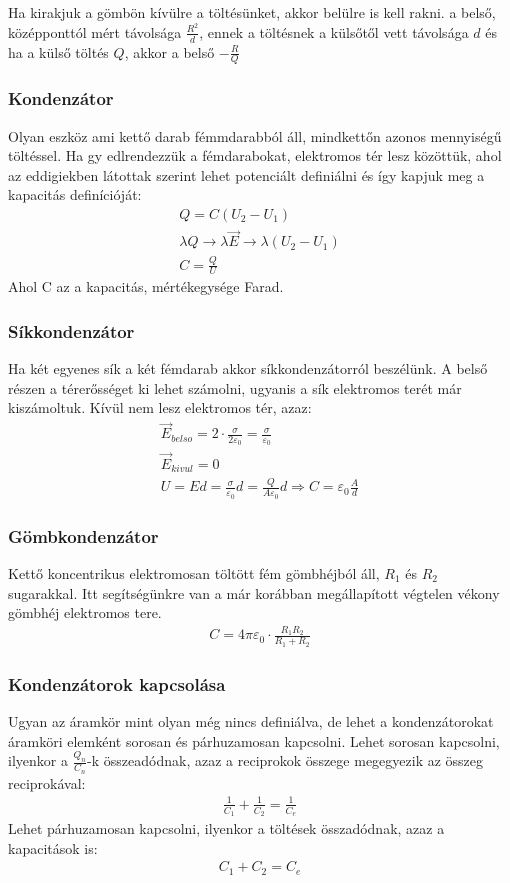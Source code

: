 \documentclass{article}
\begin{document}
Ha kirakjuk a gömbön kívülre a töltésünket, akkor belülre is kell rakni. a belső, középponttól mért távolsága $\frac{R^2}{d}$, ennek a töltésnek a külsőtől vett távolsága $d$ és ha a külső töltés $Q$, akkor a belső $-\frac{R}{Q}$
\subsubsection{Kondenzátor}
Olyan eszköz ami kettő darab fémmdarabból áll, mindkettőn azonos mennyiségű töltéssel. Ha gy edlrendezzük a fémdarabokat, elektromos tér lesz közöttük, ahol az eddigiekben látottak szerint lehet potenciált definiálni és így kapjuk meg a kapacitás definícióját:
\begin{gather*}
Q=C(U_2-U_1) \\
\lambda Q \rightarrow \lambda \vec{E} \rightarrow \lambda(U_2-U_1)  \\
C=\frac{Q}{U}
\end{gather*}
Ahol C az a kapacitás, mértékegysége Farad.
\subsubsection{Síkkondenzátor}
Ha két egyenes sík a két fémdarab akkor síkkondenzátorról beszélünk. A belső részen a térerősséget ki lehet számolni, ugyanis a sík elektromos terét már kiszámoltuk. Kívül nem lesz elektromos tér, azaz:
\begin{gather*}
\vec{E}_{belso} = 2 \cdot \frac{\sigma}{2\varepsilon_0} = \frac{\sigma}{\varepsilon_0} \\
\vec{E}_{kivul} = 0 \\
U = Ed = \frac{\sigma}{\varepsilon_0} d = \frac{Q}{A\varepsilon_0}d \Rightarrow C=\varepsilon_0 \frac{A}{d}
\end{gather*}
\subsubsection{Gömbkondenzátor}
Kettő koncentrikus elektromosan töltött fém gömbhéjból áll, $R_1$ és $R_2$ sugarakkal. Itt segítségünkre van a már korábban megállapított végtelen vékony gömbhéj elektromos tere.
\begin{gather*}
C=4\pi \varepsilon_0 \cdot \frac{R_1 R_2}{R_1 + R_2}
\end{gather*}
\subsubsection{Kondenzátorok kapcsolása}
Ugyan az áramkör mint olyan még nincs definiálva, de lehet a kondenzátorokat áramköri elemként sorosan és párhuzamosan kapcsolni.
Lehet sorosan kapcsolni, ilyenkor a $\frac{Q_n}{C_n}$-k összeadódnak, azaz a reciprokok összege megegyezik az összeg reciprokával:
\begin{gather*}
\frac{1}{C_1} + \frac{1}{C_2} = \frac{1}{C_e}
\end{gather*}
Lehet párhuzamosan kapcsolni, ilyenkor a töltések összadódnak, azaz a kapacitások is:
\begin{gather*}
C_1+C_2=C_e
\end{gather*}
\end{document}
